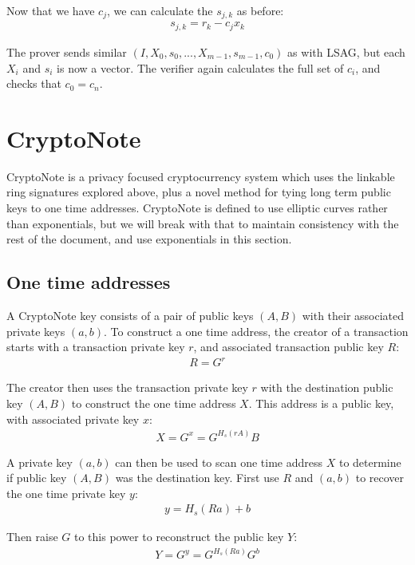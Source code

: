 \documentclass{article}
\begin{document}
Now that we have $c_j$, we can calculate the $s_{j,k}$ as before:
\begin{align}
  s_{j,k} = r_k - c_j x_k\nonumber
\end{align}

The prover sends similar $(I, X_0, s_0, ..., X_{m-1}, s_{m-1}, c_0)$ as with LSAG, but each $X_i$ and $s_i$ is now a vector.  The verifier again calculates the full set of $c_i$, and checks that $c_0 = c_n$.


\section{CryptoNote}

CryptoNote \cite{cryptonote} is a privacy focused cryptocurrency system which uses the linkable ring signatures explored above, plus a novel method for tying long term public keys to one time addresses.  CryptoNote is defined to use elliptic curves rather than exponentials, but we will break with that to maintain consistency with the rest of the document, and use exponentials in this section.


\subsection{One time addresses}

A CryptoNote key consists of a pair of public keys $(A, B)$ with their associated private keys $(a, b)$.  To construct a one time address, the creator of a transaction starts with a transaction private key $r$, and associated transaction public key $R$:
\begin{align}
  R=G^r\nonumber
\end{align}

The creator then uses the transaction private key $r$ with the destination public key $(A, B)$ to construct the one time address $X$.  This address is a public key, with associated private key $x$:
\begin{align}
  X = G^x = G^{H_s(rA)} B
\end{align}

A private key $(a, b)$ can then be used to scan one time address $X$ to determine if public key $(A, B)$ was the destination key.  First use $R$ and $(a, b)$ to recover the one time private key $y$:
\begin{align}
  y = H_s(Ra) + b
\end{align}

Then raise $G$ to this power to reconstruct the public key $Y$:
\begin{align}
  Y = G^y = G^{H_s(Ra)} G^b
\end{align}
\end{document}
